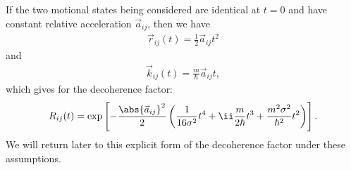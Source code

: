 If the two motional states being considered are identical at $t=0$ and have constant relative acceleration $\vec a_{ij}$, then we have
\begin{align}
\vec r_{ij}(t) = \frac12\vec a_{ij} t^2
\end{align}
and
\begin{align}
\vec k_{ij}(t) = \frac m \hbar \vec a_{ij} t,
\end{align}
which gives for the decoherence factor:
\begin{align}\label{eq:const_a_decoherence_factor}
R_{ij}(t) = \exp\left[-\frac {\abs{\vec a_{ij}}^2} 2 \left(\frac1 {16\sigma^2}t^4 + \ii\frac m{2\hbar}t^3 + \frac{m^2\sigma^2}{\hbar^2} t^2 \right)\right].
\end{align}
We will return later to this explicit form of the decoherence factor under these assumptions.

